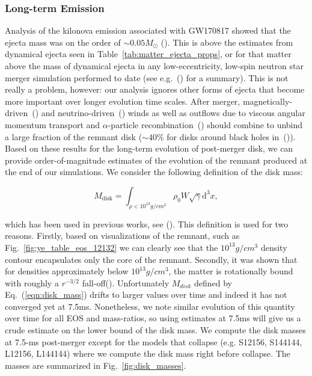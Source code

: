 \subsubsection{Long-term Emission}
\label{sec:long_term}
Analysis of the kilonova emission associated with GW170817 showed that the ejecta mass was on the order of $\sim 0.05M_\odot$ (\citet*{Metzger:2017wot,shibata2017gw170817}). This is above the estimates from dynamical ejecta seen in Table~\ref{tab:matter_ejecta_props}, or for that matter above the mass of dynamical ejecta in any low-eccentricity, low-spin neutron star merger simulation performed to date (see e.g.~(\citet*{Dietrich:2016fpt}) for a summary). This is not really a problem, however: our analysis ignores other forms of ejecta that become more important over longer evolution time scales. 
After merger, magnetically-driven~(\citet*{siegel:2017nub,fernandez2019long}) and neutrino-driven~(\citet*{just2014}) winds as well as outflows due to viscous angular momentum transport and $\alpha$-particle recombination~(\citet*{fernandez2013}) should combine to unbind a large fraction of the remnant disk ($\sim 40\%$ for disks around black holes in~(\citet*{fernandez2019long})). Based on these results for the long-term evolution of post-merger disk, we can provide order-of-magnitude estimates of the evolution of the remnant produced at the end of our simulations. We consider
the following definition of the disk mass:

\begin{equation}
  \label{eqn:disk_mass}
M_{\text{disk}} = \int_{\rho < 10^{13}g/cm^3} \rho_0 W \sqrt{\gamma} \mathrm{d}^3x,
\end{equation}

which has been used in previous works, see (\citet*{radice2018binary,shibata2017gw170817}). This definition is used for two reasons. Firstly, based on visualizations of the remnant, such as Fig.~\ref{fig:ye_table_eos_12132} we can clearly see that the $10^{13}g/cm^3$ density contour encapsulates only the core of the remnant. Secondly, it was shown that for densities approximately below $10^{13}g/cm^3$, the matter is rotationally bound with roughly a $r^{-3/2}$ fall-off(\citet*{hanauske2017rotational}). Unfortunately $M_{disk}$ defined by Eq.~(\ref{eqn:disk_mass}) drifts to larger values over time and indeed it has not converged yet at 7.5ms. Nonetheless, we note similar evolution of this quantity over time for all EOS and mass-ratios, so using estimates at 7.5ms will give us a crude estimate on the lower bound of the disk mass.  We compute the disk masses at 7.5-ms post-merger except for the models that collapse  (e.g. S12156, S144144, L12156, L144144) where we compute the disk mass right before collapse. The masses are summarized in Fig.~\ref{fig:disk_masses}. 

